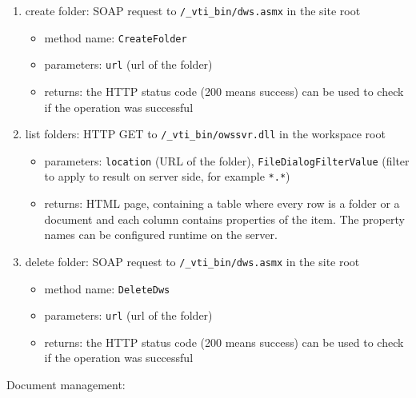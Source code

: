 \begin{enumerate}
\item create folder: SOAP request to \texttt{/\_vti\_bin/dws.asmx} in the site root
\begin{itemize}
\item method name: \texttt{CreateFolder}
\item parameters: \texttt{url} (url of the folder)
\item returns: the HTTP status code (200 means success) can be used to check if the operation was successful
\end{itemize}

\item list folders: HTTP GET to \texttt{/\_vti\_bin/owssvr.dll} in the workspace root
\begin{itemize}
\item parameters: \texttt{location} (URL of the folder), \texttt{FileDialogFilterValue} (filter to apply to result on server side, for example \texttt{*.*})
\item returns: HTML page, containing a table where every row is a folder or a
document and each column contains properties of the item. The property names
can be configured runtime on the server.
\end{itemize}

\item delete folder: SOAP request to \texttt{/\_vti\_bin/dws.asmx} in the site root
\begin{itemize}
\item method name: \texttt{DeleteDws}
\item parameters: \texttt{url} (url of the folder)
\item returns: the HTTP status code (200 means success) can be used to check if the operation was successful
\end{itemize}
\end{enumerate}

Document management:

